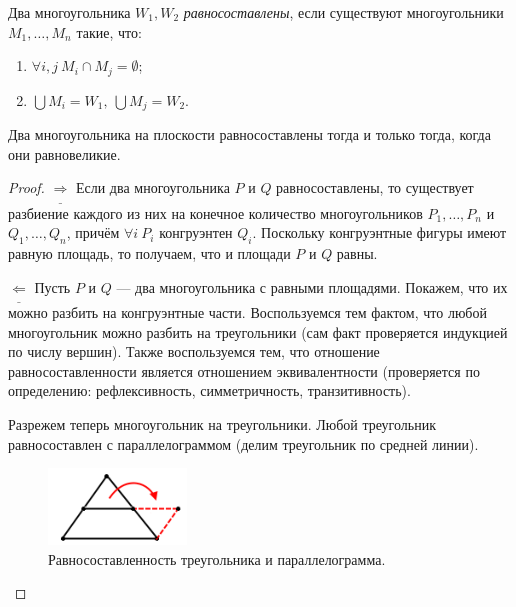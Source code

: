\begin{definition}
    Два многоугольника $W_1, W_2$ \textit{равносоставлены}, если существуют многоугольники $M_1, \dots, M_n$ такие, что:
    \begin{enumerate}
        \item $\forall i, j \ M_i \cap M_j = \emptyset$;
        \item $\bigcup M_i = W_1, \ \bigcup M_j = W_2$.
    \end{enumerate} 
\end{definition}

\begin{theorem}
    Два многоугольника на плоскости равносоставлены тогда и только тогда, когда они равновеликие.
\end{theorem}
\begin{proof}
    $\underline{\Longrightarrow}$ Если два многоугольника $P$ и $Q$ равносоставлены, то существует разбиение каждого из них на конечное количество многоугольников $P_1, \dots, P_n$ и $Q_1, \dots, Q_n$, причём $\forall i \ P_i$ конгруэнтен $Q_i$. Поскольку конгруэнтные фигуры имеют равную площадь, то получаем, что и площади $P$ и $Q$ равны.

    $\underline{\Longleftarrow}$ Пусть $P$ и $Q$ — два многоугольника с равными площадями. Покажем, что их можно разбить на конгруэнтные части. Воспользуемся тем фактом, что любой многоугольник можно разбить на треугольники (сам факт проверяется индукцией по числу вершин). Также воспользуемся тем, что отношение равносоставленности является отношением эквивалентности (проверяется по определению: рефлексивность, симметричность, транзитивность).

    Разрежем теперь многоугольник на треугольники. Любой треугольник равносоставлен с параллелограммом (делим треугольник по средней линии).

    \begin{figure}[htbp]
        \centering
        \includegraphics[scale=1]{images/c8.1.png}
        \caption{Равносоставленность треугольника и параллелограмма.}
        \label{fig:c8.1}
    \end{figure}


\end{proof}
